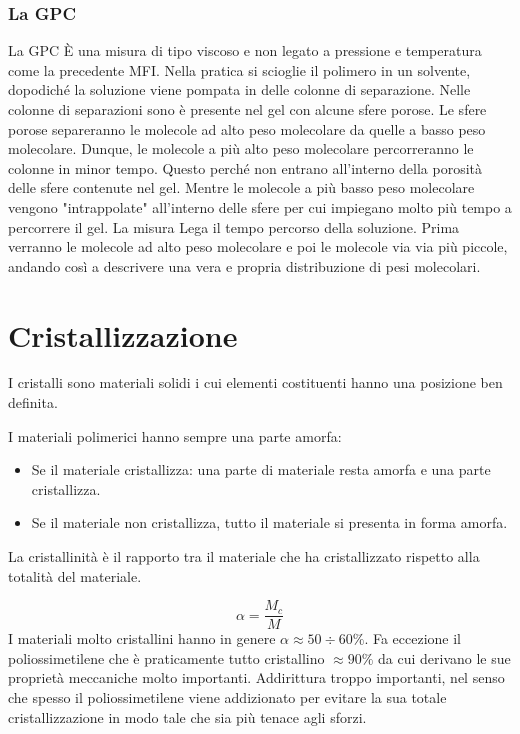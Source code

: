 \subsection{La GPC}
La \ac{GPC} È una misura di tipo viscoso e non legato a pressione e temperatura come la precedente \ac{MFI}.
Nella pratica si scioglie il polimero in un solvente, dopodiché la soluzione viene pompata in delle colonne di separazione. Nelle colonne di separazioni sono è presente nel gel con alcune sfere porose. Le sfere porose separeranno le molecole ad alto peso molecolare da quelle a basso peso molecolare.
Dunque, le molecole a più alto peso molecolare percorreranno le colonne in minor tempo. Questo perché non entrano all'interno della porosità delle sfere contenute nel gel. Mentre le molecole a più basso peso molecolare vengono "intrappolate" all'interno delle sfere per cui impiegano molto più tempo a percorrere il gel.
La misura Lega il tempo percorso della soluzione. Prima verranno le molecole ad alto peso molecolare e poi le molecole via via più piccole, andando così a descrivere una vera e propria distribuzione di pesi molecolari. 


\chapter{Cristallizzazione}\label{chp:Cristallizzazione}
I cristalli sono materiali solidi i cui elementi costituenti hanno una posizione ben definita.

I materiali polimerici hanno sempre una parte amorfa:
\begin{itemize}
\item Se il materiale cristallizza: una parte di materiale resta amorfa e una parte cristallizza.
\item Se il materiale non cristallizza, tutto il materiale si presenta in forma amorfa. 
\end{itemize}
La cristallinità è il rapporto tra il materiale che ha cristallizzato rispetto alla totalità del materiale.

\begin{equation}
\alpha = \frac{M_c}{M}
\label{eqn:Cristallinità}
\end{equation}
I materiali molto cristallini hanno in genere $\alpha \approx 50 \div 60 \%$.
Fa eccezione il poliossimetilene che è praticamente tutto cristallino $\approx 90\%$ da cui derivano le sue proprietà meccaniche molto importanti. Addirittura troppo importanti, nel senso che spesso il poliossimetilene viene addizionato per evitare la sua totale cristallizzazione in modo tale che sia più tenace agli sforzi.

